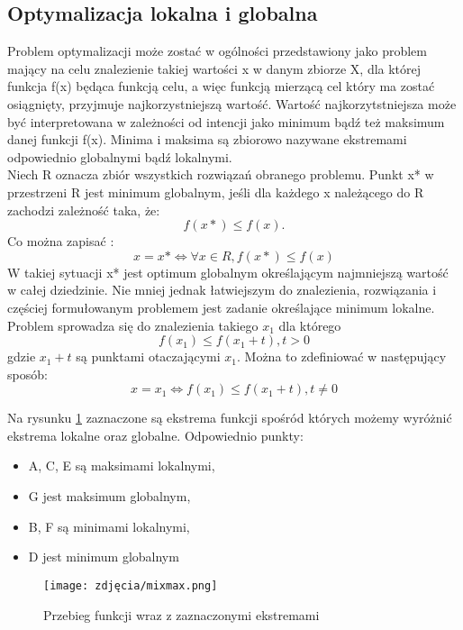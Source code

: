 \subsection{Optymalizacja lokalna i globalna}

Problem optymalizacji może zostać w ogólności przedstawiony jako problem mający na celu znalezienie takiej wartości x w danym zbiorze X, dla której funkcja f(x) będąca funkcją celu, a więc funkcją mierzącą cel który ma zostać osiągnięty, przyjmuje najkorzystniejszą wartość. Wartość najkorzytstniejsza może być interpretowana w zależności od intencji jako minimum bądź też maksimum danej funkcji f(x). Minima i maksima są zbiorowo nazywane ekstremami odpowiednio globalnymi bądź lokalnymi.\\

Niech R oznacza zbiór wszystkich rozwiązań obranego problemu. Punkt x* w przestrzeni R jest minimum globalnym, jeśli dla każdego x należącego do R zachodzi zależność taka, że:
$$
 f(x*) \le f(x).
$$
Co można zapisać :
$$
x = x*   \Leftrightarrow   \forall x \in R,    f(x*)\le f(x)
$$
W takiej sytuacji x* jest optimum globalnym określającym najmniejszą wartość w całej dziedzinie. Nie mniej jednak łatwiejszym do znalezienia, rozwiązania i częściej formułowanym problemem jest zadanie określające minimum lokalne. Problem sprowadza się do znalezienia takiego $x_{1} $ dla którego 
$$
f(x_{1}) \le f(x_{1} + t), t >0
$$
gdzie $x_{1} + t $ są punktami otaczającymi $x_{1}$.
Można to zdefiniować w następujący sposób:
$$
x = x_{1} \Leftrightarrow f(x_{1}) \le f(x_{1} + t), t \ne 0
$$

Na rysunku \ref{minmax} zaznaczone są ekstrema funkcji spośród których możemy wyróżnić ekstrema lokalne oraz globalne. Odpowiednio punkty:\\

\begin{itemize}
\item A, C, E są maksimami lokalnymi,
\item G jest maksimum globalnym,
\item B, F są minimami lokalnymi,
\item D jest minimum globalnym
\end{itemize}

\begin{figure}[h!]
\begin{center}
		\texttt{[image: zdjęcia/mixmax.png]}
		\caption{Przebieg funkcji wraz z zaznaczonymi ekstremami}
		\label{minmax}		
\end{center}	
\end{figure}

